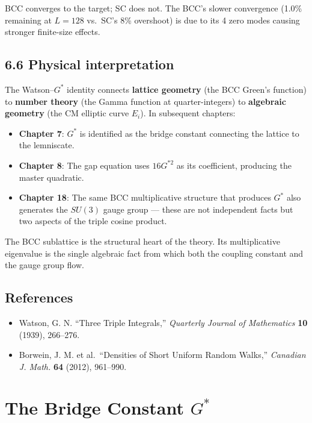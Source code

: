 \documentclass[
  11pt,
  letterpaper,
  twoside,
  openright]{book}
\providecommand{\tightlist}{%
  \setlength{\itemsep}{0pt}\setlength{\parskip}{0pt}}
\begin{document}
BCC converges to the target; SC does not. The BCC's slower convergence
(1.0\% remaining at \(L = 128\) vs.~SC's 8\% overshoot) is due to its 4
zero modes causing stronger finite-size effects.

\section{6.6 Physical interpretation}\label{physical-interpretation}

The Watson--\(G^*\) identity connects \textbf{lattice geometry} (the BCC
Green's function) to \textbf{number theory} (the Gamma function at
quarter-integers) to \textbf{algebraic geometry} (the CM elliptic curve
\(E_i\)). In subsequent chapters:

\begin{itemize}
\tightlist
\item
  \textbf{Chapter 7}: \(G^*\) is identified as the bridge constant
  connecting the lattice to the lemniscate.
\item
  \textbf{Chapter 8}: The gap equation uses \(16 G^{*2}\) as its
  coefficient, producing the master quadratic.
\item
  \textbf{Chapter 18}: The same BCC multiplicative structure that
  produces \(G^*\) also generates the \(SU(3)\) gauge group --- these
  are not independent facts but two aspects of the triple cosine
  product.
\end{itemize}

The BCC sublattice is the structural heart of the theory. Its
multiplicative eigenvalue is the single algebraic fact from which both
the coupling constant and the gauge group flow.

\section{References}\label{references}

\begin{itemize}
\tightlist
\item
  Watson, G. N. ``Three Triple Integrals,'' \emph{Quarterly Journal of
  Mathematics} \textbf{10} (1939), 266--276.
\item
  Borwein, J. M. et al.~``Densities of Short Uniform Random Walks,''
  \emph{Canadian J. Math.} \textbf{64} (2012), 961--990.
\end{itemize}

\chapter{\texorpdfstring{The Bridge Constant
\(G^*\)}{The Bridge Constant G\^{}*}}\label{sec-gstar}
\end{document}
